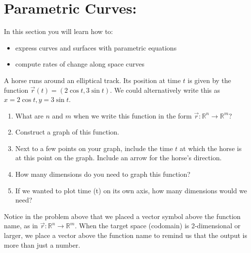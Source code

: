 \section{Parametric Curves:} %
In this section you will learn how to:
\begin{itemize}
	\item express curves and surfaces with parametric equations
	\item compute rates of change along space curves
\end{itemize}

\begin{problem}\label{prob:parametric curve in plane}
\marginpar{
See \href{http://aleph.sagemath.org/?z=eJwrsS1LLNJQL1HX5CpILErMTS0pykyOL8jJL9GINtJKzi_WKNHUUTDWKs7MA7JidRQ0SnQMdIy0CjI1NQFWdRJT}{Sage} or \href{http://wolfr.am/wAkR8l}{Wolfram Alpha}. %
}
%
A horse runs around an elliptical track. Its position at time $t$ is given by the  function $\vec r(t)=(2\cos t, 3\sin t).$ We could alternatively write this as $x=2\cos t, y=3\sin t$. 
 \begin{enumerate}
  \item What are $n$ and $m$ when we write this function in the form  $\vec r\colon {\mathbb{R}}^n\to {\mathbb{R}}^m$?
  \item Construct a graph of this function. 
  \item Next to a few points on your graph, include the time $t$ at which the horse is at this point on the graph. Include an arrow for the horse's direction.
  \item How many dimensions do you need to graph this function?
	\item If we wanted to plot time (t) on its own axis, how many dimensions would we need?
 \end{enumerate}
\end{problem}


Notice in the problem above that we placed a vector symbol above the function name, as in $\vec r\colon {\mathbb{R}}^n\to {\mathbb{R}}^m$.  When the target space (codomain) is 2-dimensional or larger, we place a vector above the function name to remind us that the output is more than just a number.

